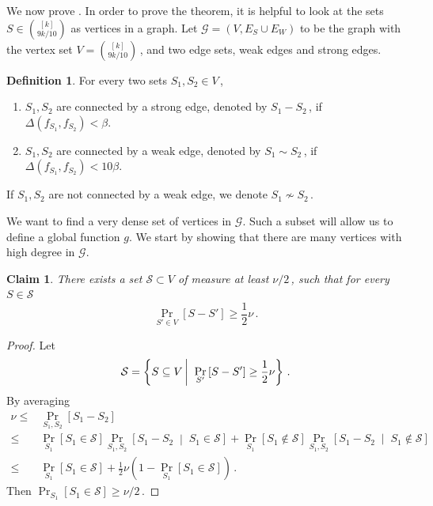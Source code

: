 \documentclass[11pt]{article}
\numberwithin{equation}{section}
\newtheorem{claim}[theorem]{Claim}
\theoremstyle{definition}
\newtheorem{definition}[theorem]{Definition}
\theoremstyle{plain}
\newcommand{\Prob}[2][]{\Pr_{{#1}}\left[#2\right]} %
\newcommand{\Paren}[1]{\left(#1\right)} %
\newcommand{\given}{\;\middle\vert\;} %
\newcommand\sett[2]{\left\{ #1 \left| \; \vphantom{#1 #2} \right. #2  \right\}} %
\newcommand\setf{f} %
\newcommand\pf{g} %
\newcommand{\diff}{\Delta} %
\newcommand\wconn{\sim} %
\newcommand\sconn{-} %
\begin{document}
We now prove .
In order to prove the theorem, it is helpful to look at the sets $S\in\binom{[k]}{9k/10}$ as vertices in a graph. Let $\mathcal{G}=(V,E_S\cup E_W)$ to be the graph with the vertex set $V=\binom{[k]}{9k/10}$\,, and two edge sets, weak edges and strong edges.
\begin{definition}
	For every two sets $S_1,S_2\in V$\,,
	\begin{enumerate}
		\item $S_1,S_2$ are connected by a strong edge, denoted by $S_1\sconn S_2$\,, if $\diff(\setf_{S_1},\setf_{S_2}) < \beta$.
		\item $S_1,S_2$ are connected by a weak edge, denoted by $S_1\wconn S_2$\,, if $\diff(\setf_{S_1},\setf_{S_2}) < 10\beta$.
	\end{enumerate}
	If $S_1,S_2$ are not connected by a weak edge, we denote $S_1 \not\wconn S_2$\,. %
\end{definition}

We want to find a very dense set of vertices in $\mathcal{G}$. Such a subset will allow us to define a global function $\pf$. We start by showing that there are many vertices with high degree in $\mathcal{G}$.
\begin{claim}\label{claim:star}
	There exists a set $\mathcal{S}\subset V$  of measure at least 
	$\nu/2$\,, %
  such that for every $S\in\mathcal{S}$  \[\Prob[S'\in V]{S\sconn S'} \geq\frac{1}{2}\nu\,.\]
\end{claim}
\begin{proof}
	Let
	\[\mathcal{S} = \sett{S\subseteq V}{\Prob[S']{S\sconn S'} \geq \frac{1}{2}\nu}\,. \]%
	By averaging
	\begin{align*}
	\nu \leq&  \Prob[S_1,S_2]{S_1\sconn S_2}
	\\ \leq& \Prob[S_1]{S_1\in\mathcal{S}}\Prob[S_1,S_2]{S_1\sconn S_2\given S_1\in\mathcal{S}} +\Prob[S_1]{S_1\notin\mathcal{S}}\Prob[S_1,S_2]{S_1\sconn S_2\given S_1\notin\mathcal{S}}
	\\ \leq&  \Prob[S_1]{S_1\in\mathcal{S}} + \frac{1}{2}\nu\Paren{1-\Prob[S_1]{S_1\in\mathcal{S}}}\,.%
	\end{align*}
	Then $\Prob[S_1]{S_1\in\mathcal{S}} \geq 
	\nu/2$\,. %
\end{proof}
\end{document}
